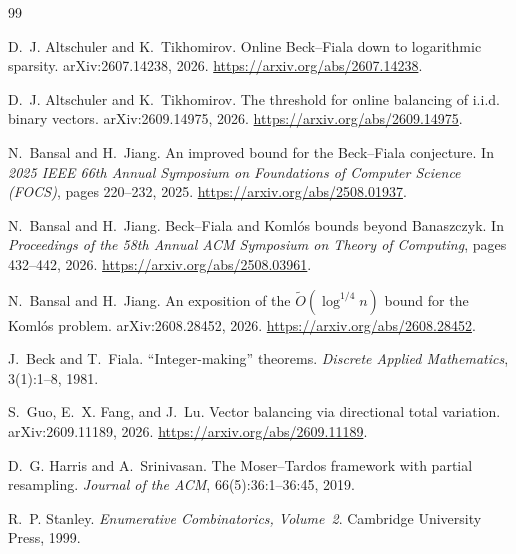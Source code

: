 \documentclass[reqno]{amsart}
\theoremstyle{definition}
\begin{document}
\begin{thebibliography}{99}\small

 D.~J. Altschuler and K.~Tikhomirov. \newblock Online Beck--Fiala down to logarithmic sparsity. \newblock arXiv:2607.14238, 2026. \newblock \url{https://arxiv.org/abs/2607.14238}.

 D.~J. Altschuler and K.~Tikhomirov. \newblock The threshold for online balancing of i.i.d. binary vectors. \newblock arXiv:2609.14975, 2026. \newblock \url{https://arxiv.org/abs/2609.14975}.

 N.~Bansal and H.~Jiang. \newblock An improved bound for the Beck--Fiala conjecture. \newblock In \emph{2025 IEEE 66th Annual Symposium on Foundations of Computer Science (FOCS)}, pages 220--232, 2025. \newblock \url{https://arxiv.org/abs/2508.01937}.

 N.~Bansal and H.~Jiang. \newblock Beck--Fiala and Koml\'os bounds beyond Banaszczyk. \newblock In \emph{Proceedings of the 58th Annual ACM Symposium on Theory of Computing}, pages 432--442, 2026. \newblock \url{https://arxiv.org/abs/2508.03961}.

 N.~Bansal and H.~Jiang. \newblock An exposition of the $\widetilde O(\log^{1/4}n)$ bound for the Koml\'os problem. \newblock arXiv:2608.28452, 2026. \newblock \url{https://arxiv.org/abs/2608.28452}.

 J.~Beck and T.~Fiala. \newblock ``Integer-making'' theorems. \newblock \emph{Discrete Applied Mathematics}, 3(1):1--8, 1981.

 S.~Guo, E.~X. Fang, and J.~Lu. \newblock Vector balancing via directional total variation. \newblock arXiv:2609.11189, 2026. \newblock \url{https://arxiv.org/abs/2609.11189}.

 D.~G. Harris and A.~Srinivasan. \newblock The Moser--Tardos framework with partial resampling. \newblock \emph{Journal of the ACM}, 66(5):36:1--36:45, 2019.

 R.~P. Stanley. \emph{Enumerative Combinatorics, Volume~2}. Cambridge University Press, 1999.

\end{thebibliography}
\end{document}

